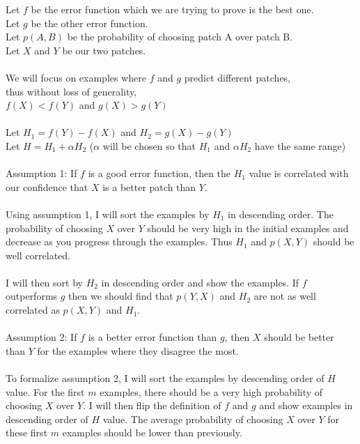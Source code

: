 \documentclass[12pt,psfig]{article}
\begin{document}
\setlength{\parskip}{1.2ex plus0.3ex minus 0.3ex}


\thispagestyle{empty} \pagestyle{myheadings} 

Let $f$ be the error function which we are trying to prove is the best one.\\
Let $g$ be the other error function.\\
Let $p(A,B)$ be the probability of choosing patch A over patch B.\\
Let $X$ and $Y$ be our two patches.\\
\\
We will focus on examples where $f$ and $g$ predict different patches, \\
thus without loss of generality,\\
$f(X) < f(Y)$ and $g(X) > g(Y)$\\
\\
Let $H_1 = f(Y)-f(X)$ and $H_2 = g(X)-g(Y)$\\
Let $H = H_1 + \alpha H_2$ ($\alpha$ will be chosen so that $H_1$ and $\alpha H_2$ have the same range)\\
\\
Assumption 1: If $f$ is a good error function, then the $H_1$ value is correlated with our confidence that $X$ is a better patch than $Y$.\\
\\
Using assumption 1, I will sort the examples by $H_1$ in descending order. The probability of choosing $X$ over $Y$ should be very high in the initial examples and decrease as you progress through the examples. Thus $H_1$ and $p(X,Y)$ should be well correlated.\\
\\
I will then sort by $H_2$ in descending order and show the examples. If $f$ outperforms $g$ then we should find that $p(Y,X)$ and $H_2$ are not as well correlated as $p(X,Y)$ and $H_1$.  \\
\\
Assumption 2: If $f$ is a better error function than $g$, then $X$ should be better than $Y$ for the examples where they disagree the most.\\
\\
To formalize assumption 2, I will sort the examples by descending order of $H$ value. For the first $m$ examples, there should be a very high probability of choosing $X$ over $Y$. I will then flip the definition of $f$ and $g$ and show examples in descending order of $H$ value. The average probability of choosing $X$ over $Y$ for these first $m$ examples should be lower than previously.
\end{document}
